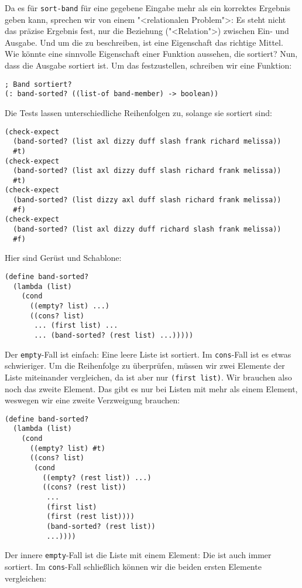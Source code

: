 Da es für \lstinline{sort-band} für eine gegebene Eingabe mehr als ein
korrektes Ergebnis geben kann, sprechen wir von einem "<relationalen
Problem">: Es steht nicht das präzise
Ergebnis fest, nur die Beziehung ("<Relation">) zwischen Ein- und
Ausgabe.  Und um die zu beschreiben, ist eine Eigenschaft das richtige
Mittel.  Wie könnte eine sinnvolle Eigenschaft einer Funktion
aussehen, die sortiert?
Nun, dass die Ausgabe sortiert ist.  Um das festzustellen, schreiben
wir eine Funktion:
%
\begin{lstlisting}
; Band sortiert?
(: band-sorted? ((list-of band-member) -> boolean))
\end{lstlisting}
%
Die Tests lassen unterschiedliche Reihenfolgen zu, solange sie
sortiert sind:
%
\begin{lstlisting}
(check-expect
  (band-sorted? (list axl dizzy duff slash frank richard melissa))
  #t)
(check-expect
  (band-sorted? (list axl dizzy duff slash richard frank melissa))
  #t)
(check-expect
  (band-sorted? (list dizzy axl duff slash richard frank melissa))
  #f)
(check-expect
  (band-sorted? (list axl dizzy duff richard slash frank melissa))
  #f)
\end{lstlisting}
%
Hier sind Gerüst und Schablone:
%
\begin{lstlisting}
(define band-sorted?
  (lambda (list)
    (cond
      ((empty? list) ...)
      ((cons? list)
       ... (first list) ...
       ... (band-sorted? (rest list) ...)))))
\end{lstlisting}
%
Der \lstinline{empty}-Fall ist einfach: Eine leere Liste ist sortiert.
Im \lstinline{cons}-Fall ist es etwas schwieriger.  Um die Reihenfolge
zu überprüfen, müssen wir zwei Elemente der Liste miteinander
vergleichen, da ist aber nur \lstinline{(first list)}.  Wir brauchen
also noch das zweite Element.  Das gibt es nur bei Listen mit mehr als
einem Element, weswegen wir eine zweite Verzweigung brauchen:
%
\begin{lstlisting}
(define band-sorted?
  (lambda (list)
    (cond
      ((empty? list) #t)
      ((cons? list)
       (cond
         ((empty? (rest list)) ...)
         ((cons? (rest list))
          ...
          (first list)
          (first (rest list))))
          (band-sorted? (rest list))
          ...))))
\end{lstlisting}
%
Der innere \lstinline{empty}-Fall ist die Liste mit einem Element: Die
ist auch immer sortiert.  Im \lstinline{cons}-Fall schließlich können
wir die beiden ersten Elemente vergleichen:
%

